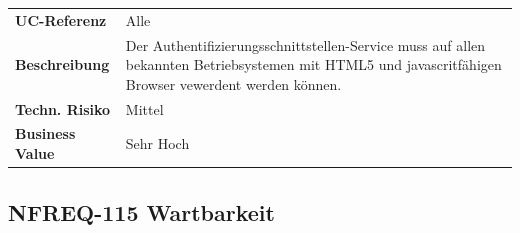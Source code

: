 \begin{longtable}[c]{@{}ll@{}}
\toprule
\begin{minipage}[t]{0.20\columnwidth}\raggedright\strut
\textbf{UC-Referenz}
\strut\end{minipage} &
\begin{minipage}[t]{0.74\columnwidth}\raggedright\strut
Alle
\strut\end{minipage}\tabularnewline
\begin{minipage}[t]{0.20\columnwidth}\raggedright\strut
\textbf{Beschreibung}
\strut\end{minipage} &
\begin{minipage}[t]{0.74\columnwidth}\raggedright\strut
Der Authentifizierungsschnittstellen-Service muss auf allen bekannten
Betriebsystemen mit HTML5 und javascritfähigen Browser vewerdent werden
können.
\strut\end{minipage}\tabularnewline
\begin{minipage}[t]{0.20\columnwidth}\raggedright\strut
\textbf{Techn. Risiko}
\strut\end{minipage} &
\begin{minipage}[t]{0.74\columnwidth}\raggedright\strut
Mittel
\strut\end{minipage}\tabularnewline
\begin{minipage}[t]{0.20\columnwidth}\raggedright\strut
\textbf{Business Value}
\strut\end{minipage} &
\begin{minipage}[t]{0.74\columnwidth}\raggedright\strut
Sehr Hoch
\strut\end{minipage}\tabularnewline
\bottomrule
\end{longtable}

\subsection{NFREQ-115 Wartbarkeit}\label{nfreq-115-wartbarkeit}

